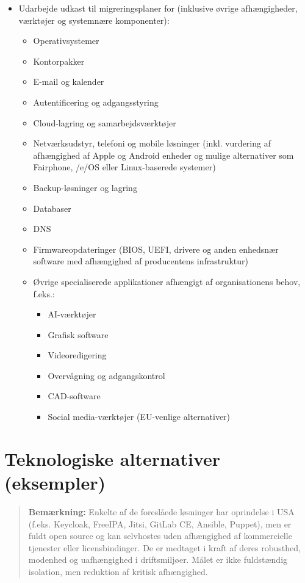 \documentclass[a4paper,11pt]{book}
\begin{document}
\begin{itemize}
\item
  Udarbejde udkast til migreringsplaner for (inklusive øvrige
  afhængigheder, værktøjer og systemnære komponenter):

  \begin{itemize}
  \item
    Operativsystemer
  \item
    Kontorpakker
  \item
    E-mail og kalender
  \item
    Autentificering og adgangsstyring
  \item
    Cloud-lagring og samarbejdsværktøjer
  \item
    Netværksudstyr, telefoni og mobile løsninger (inkl. vurdering af
    afhængighed af Apple og Android enheder og mulige alternativer som
    Fairphone, /e/OS eller Linux-baserede systemer)
  \item
    Backup-løsninger og lagring
  \item
    Databaser
  \item
    DNS
  \item
    Firmwareopdateringer (BIOS, UEFI, drivere og anden enhedsnær
    software med afhængighed af producentens infrastruktur)
  \item
    Øvrige specialiserede applikationer afhængigt af organisationens
    behov, f.eks.:

    \begin{itemize}
    \tightlist
    \item
      AI-værktøjer
    \item
      Grafisk software
    \item
      Videoredigering
    \item
      Overvågning og adgangskontrol
    \item
      CAD-software
    \item
      Social media-værktøjer (EU-venlige alternativer)
    \end{itemize}
  \end{itemize}
\end{itemize}

\section{Teknologiske alternativer
(eksempler)}\label{teknologiske-alternativer-eksempler}

\begin{quote}
\textbf{Bemærkning:} Enkelte af de foreslåede løsninger har oprindelse i
USA (f.eks. Keycloak, FreeIPA, Jitsi, GitLab CE, Ansible, Puppet), men
er fuldt open source og kan selvhostes uden afhængighed af kommercielle
tjenester eller licensbindinger. De er medtaget i kraft af deres
robusthed, modenhed og uafhængighed i driftsmiljøer. Målet er ikke
fuldstændig isolation, men reduktion af kritisk afhængighed.
\end{quote}
\end{document}
